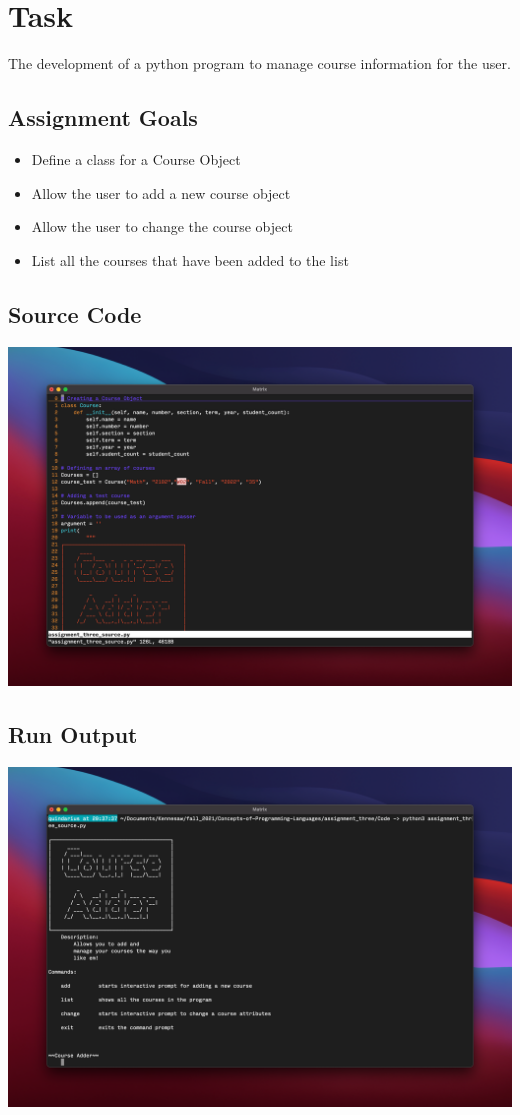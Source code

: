 \documentclass{report}
\begin{document}


\section*{Task}
The development of a python program to manage course information for the user. 

\vspace{0.5cm}

\subsection*{Assignment Goals}
\begin{itemize}

	\item Define a class for a Course Object 
	\item Allow the user to add a new course object  
	\item Allow the user to change the course object  
	\item List all the courses that have been added to the list
\end{itemize}

\subsection*{Source Code}
\includegraphics[width = \textwidth]{source}
\subsection*{Run Output}
\includegraphics[width = \textwidth]{run}
\end{document}
